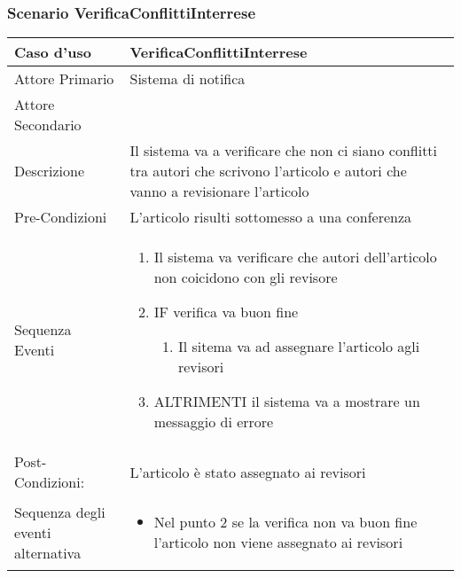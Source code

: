 \subsubsection{Scenario VerificaConflittiInterrese}
\begin{tabular}{|p{3cm}|p{7cm}|}
\hline 
\rowcolor{Orchid}
Caso d'uso & VerificaConflittiInterrese \\
\hline
Attore Primario & Sistema di notifica\\
\hline
Attore Secondario & \\
\hline
Descrizione & Il sistema va a verificare che non ci siano conflitti tra autori che scrivono l'articolo e autori che vanno a revisionare l'articolo\\
\hline
Pre-Condizioni& L'articolo risulti sottomesso a una conferenza\\
\hline
  Sequenza Eventi&
                  \begin{enumerate}
                   \item Il sistema va verificare che autori dell'articolo non coicidono con gli revisore
                   \item IF verifica va buon fine
                    \begin{enumerate}
                      \item Il sitema va ad assegnare l'articolo agli revisori
                    \end{enumerate}
                    \item ALTRIMENTI il sistema va a mostrare un messaggio di errore
                  \end{enumerate}\\
\hline
Post-Condizioni: & L'articolo è stato assegnato ai revisori\\
\hline
Sequenza degli eventi alternativa & \begin{itemize}
  \item Nel punto 2 se la verifica non va buon fine l'articolo non viene assegnato ai revisori
\end{itemize} \\
\hline
\end{tabular}

